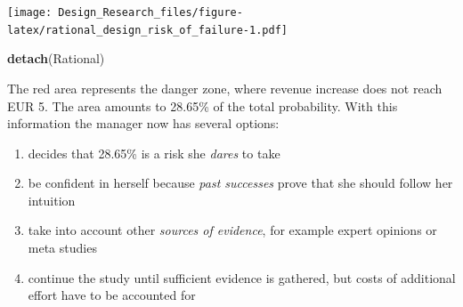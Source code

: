 \documentclass[]{svmono}
\newenvironment{Shaded}{\begin{snugshade}}{\end{snugshade}}
\newcommand{\KeywordTok}[1]{\textcolor[rgb]{0.13,0.29,0.53}{\textbf{#1}}}
\newcommand{\DataTypeTok}[1]{\textcolor[rgb]{0.13,0.29,0.53}{#1}}
\newcommand{\DecValTok}[1]{\textcolor[rgb]{0.00,0.00,0.81}{#1}}
\newcommand{\FloatTok}[1]{\textcolor[rgb]{0.00,0.00,0.81}{#1}}
\newcommand{\StringTok}[1]{\textcolor[rgb]{0.31,0.60,0.02}{#1}}
\newcommand{\OperatorTok}[1]{\textcolor[rgb]{0.81,0.36,0.00}{\textbf{#1}}}
\newcommand{\NormalTok}[1]{#1}
\providecommand{\tightlist}{%
  \setlength{\itemsep}{0pt}\setlength{\parskip}{0pt}}
\theoremstyle{definition}
\theoremstyle{definition}
\theoremstyle{definition}
\theoremstyle{remark}
\begin{document}
\begin{Shaded}
\end{Shaded}

\texttt{[image: Design\_Research\_files/figure-latex/rational\_design\_risk\_of\_failure-1.pdf]}

\begin{Shaded}
\begin{Highlighting}[]
\KeywordTok{detach}\NormalTok{(Rational)  }
\end{Highlighting}
\end{Shaded}

The red area represents the danger zone, where revenue increase does not
reach EUR 5. The area amounts to 28.65\% of the total probability. With
this information the manager now has several options:

\begin{enumerate}
\def\labelenumi{\arabic{enumi})}
\tightlist
\item
  decides that 28.65\% is a risk she \emph{dares} to take
\item
  be confident in herself because \emph{past successes} prove that she
  should follow her intuition
\item
  take into account other \emph{sources of evidence}, for example expert
  opinions or meta studies
\item
  continue the study until sufficient evidence is gathered, but costs of
  additional effort have to be accounted for
\end{enumerate}
\end{document}
